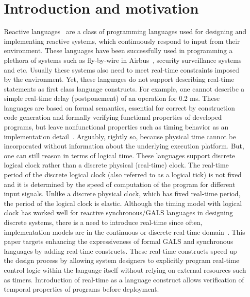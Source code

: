 \section{Introduction and motivation}
\label{sec:intr-motiv}

Reactive languages~\cite{gber931,amal10} are a class of programming
languages used for designing and implementing reactive systems, which
continuously respond to input from their environment. These languages
have been successfully used in programming a plethora of systems such as
fly-by-wire in Airbus~\cite{eairbus}, security surveillance
systems~\cite{amal121} and etc. Usually these systems also need to meet
real-time constraints imposed by the environment. Yet, these languages
do not support describing real-time statements as first class language
constructs.  For example, one cannot describe a simple real-time delay
(postponement) of an operation for 0.2 ms. These languages are based on
formal semantics, essential for correct by construction code generation
and formally verifying functional properties of developed programs, but
leave nonfunctional properties such as timing behavior as an
implementation detail~\cite{boldt07}. Arguably, rightly so, because
physical time cannot be incorporated without information about the
underlying execution platform.  But, one can still reason in terms of
logical time. These languages support discrete logical clock rather than
a discrete physical (real-time) clock. The real-time period of the
discrete logical clock (also referred to as a logical tick) is not fixed
and it is determined by the speed of computation of the program for
different input signals. Unlike a discrete physical clock, which has
fixed real-time period, the period of the logical clock is elastic.
Although the timing model with logical clock has worked well for
reactive synchronous/GALS languages in designing discrete systems, there
is a need to introduce real-time since often, implementation models are
in the continuous or discrete real-time
domain~\cite{DBLP:journals/pieee/SifakisTY03}. This paper targets
enhancing the expressiveness of formal GALS and synchronous languages by
adding real-time constructs. These real-time constructs speed up the
design process by allowing system designers to explicitly program
real-time control logic within the language itself without relying on
external resources such as timers. Introduction of real-time as a
language construct allows verification of temporal properties of
programs before deployment.


